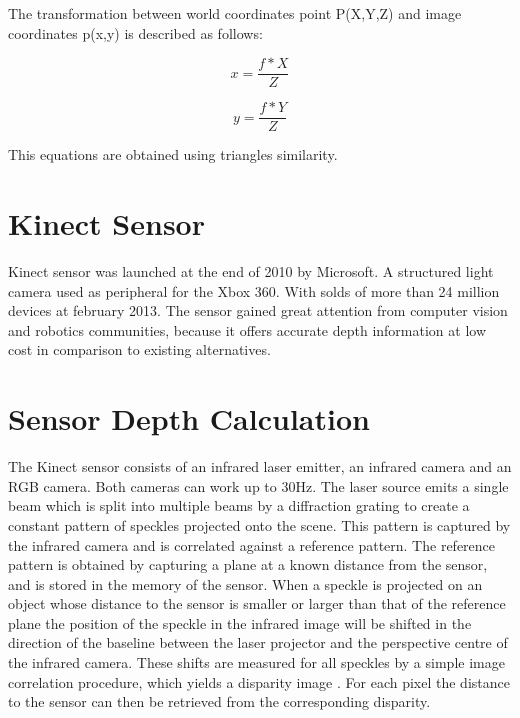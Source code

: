 The transformation between world coordinates point P(X,Y,Z) and image coordinates p(x,y) is described as 
follows:

\begin{equation}
\label{eq:disparity2}
 x = \frac{f*X}{Z}
\end{equation}

\begin{equation}
\label{eq:disparity2}
 y = \frac{f*Y}{Z}
\end{equation}

This equations are  obtained using triangles similarity.

\section{Kinect Sensor}

Kinect sensor was launched at the end of 2010 by Microsoft. A structured light camera 
used as peripheral for the Xbox 360. With solds of more than 24 million devices at february 2013.
The sensor gained great attention from computer vision and robotics communities, because it offers 
accurate depth information at low cost in comparison to existing alternatives.

\section{Sensor Depth Calculation}

The Kinect sensor consists of an infrared laser emitter, an 
infrared camera and an RGB camera. Both cameras can work up to 30Hz. 
The laser source emits a single 
beam which is split into multiple beams by a diffraction 
grating to create a constant 
pattern of speckles projected onto the scene. This pattern is 
captured by the infrared camera and is correlated against a 
reference pattern. The reference pattern is obtained by capturing 
a plane at a known distance from the sensor, and is stored in the 
memory of the sensor. When a speckle is projected on an object 
whose distance to the sensor is smaller or larger than that of the 
reference plane the position of the speckle in the infrared image 
will be shifted in the direction of the baseline between the laser 
projector and the perspective centre of the infrared camera. 
These shifts are measured for all speckles by a simple image 
correlation procedure, which yields a disparity image \cite{khoshelham2011accuracy} . For each 
pixel the distance to the sensor can then be retrieved from the 
corresponding disparity.



